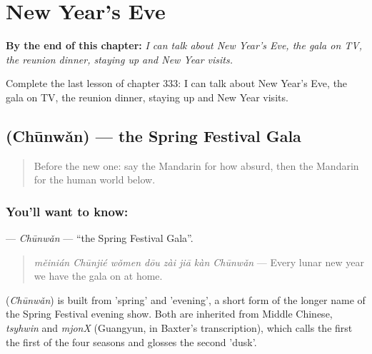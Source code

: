 
\chapter{New Year's Eve}
\label{ch:zh-new-year-s-eve}

\begin{chapteropening}
\textbf{By the end of this chapter:} \emph{I can talk about New Year's Eve, the gala on TV, the reunion dinner, staying up and New Year visits.}

Complete the last lesson of chapter 333: I can talk about New Year's Eve, the gala on TV, the reunion dinner, staying up and New Year visits.
\end{chapteropening}

\section[\texorpdfstring{\zh{春晚} (Chūnwǎn)}{春晚 (Chūnwǎn)}]{ (Chūnwǎn) — the Spring Festival Gala}

\label{lesson:ZH-C333-chunwan}



\begin{quote}
Before the new one: say the Mandarin for how absurd, then the Mandarin for the human world below.
\end{quote}

\subsection*{You'll want to know: }
\textbf{} — \emph{Chūnwǎn} — \textquotedblleft{}the Spring Festival Gala\textquotedblright{}.

\begin{quote}
\textbf{} \emph{měinián Chūnjié wǒmen dōu zài jiā kàn Chūnwǎn} — Every lunar new year we have the gala on at home.
\end{quote}

\begin{cousinweb}
\textbf{} (\emph{Chūnwǎn}) is built from  'spring' and  'evening', a short form of the longer name of the Spring Festival evening show. Both are inherited from Middle Chinese, \emph{tsyhwin} and \emph{mjonX} (Guangyun, in Baxter's transcription), which calls the first the first of the four seasons and glosses the second 'dusk'.
\end{cousinweb}

